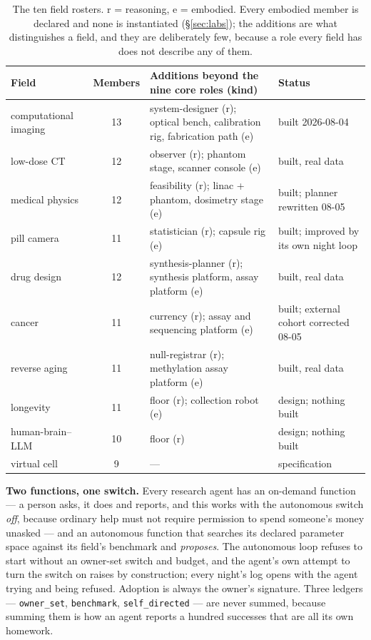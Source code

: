 \documentclass[11pt]{article}
\theoremstyle{definition}
\begin{document}
\begin{table}[!htbp]
\centering\scriptsize
\begin{tabularx}{\textwidth}{@{}lcYl@{}}
\toprule
Field & Members & Additions beyond the nine core roles (kind) & Status \\
\midrule
computational imaging & 13 & system-designer (r); optical bench, calibration rig, fabrication path (e) & built 2026-08-04 \\
low-dose CT & 12 & observer (r); phantom stage, scanner console (e) & built, real data \\
medical physics & 12 & feasibility (r); linac + phantom, dosimetry stage (e) & built; planner rewritten 08-05 \\
pill camera & 11 & statistician (r); capsule rig (e) & built; improved by its own night loop \\
drug design & 12 & synthesis-planner (r); synthesis platform, assay platform (e) & built, real data \\
cancer & 11 & currency (r); assay and sequencing platform (e) & built; external cohort corrected 08-05 \\
reverse aging & 11 & null-registrar (r); methylation assay platform (e) & built, real data \\
longevity & 11 & floor (r); collection robot (e) & design; nothing built \\
human-brain--LLM & 10 & floor (r) & design; nothing built \\
virtual cell & 9 & --- & specification \\
\bottomrule
\end{tabularx}
\caption{The ten field rosters. r = reasoning, e = embodied. Every embodied member is declared and none is instantiated (\S\ref{sec:labs}); the additions are what distinguishes a field, and they are deliberately few, because a role every field has does not describe any of them.}
\label{tab:rosters}
\end{table}

\textbf{Two functions, one switch.} Every research agent has an on-demand function --- a person asks, it does and reports, and this works with the autonomous switch \emph{off}, because ordinary help must not require permission to spend someone's money unasked --- and an autonomous function that searches its declared parameter space against its field's benchmark and \emph{proposes}. The autonomous loop refuses to start without an owner-set switch and budget, and the agent's own attempt to turn the switch on raises by construction; every night's log opens with the agent trying and being refused. Adoption is always the owner's signature. Three ledgers --- \texttt{owner\_set}, \texttt{benchmark}, \texttt{self\_directed} --- are never summed, because summing them is how an agent reports a hundred successes that are all its own homework.
\end{document}

